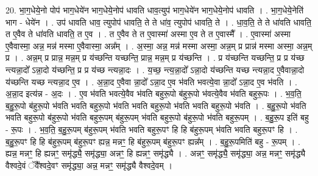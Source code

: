 \documentclass[17pt]{extarticle}
\begin{document}
20. भा॒ग॒धेये॒नो पोप॑ भाग॒धेये॑न भाग॒धेये॒नोप॑ धावति धाव॒त्युप॑ भाग॒धेये॑न भाग॒धेये॒नोप॑ धावति । . भा॒ग॒धेये॒नेति॑ भाग - धेये॑न । . उप॑ धावति धाव॒ त्युपोप॑ धावति॒ ते ते धा॑व॒ त्युपोप॑ धावति॒ ते । . धा॒व॒ति॒ ते ते धा॑वति धावति॒ त ए॒वैव ते धा॑वति धावति॒ त ए॒व । . त ए॒वैव ते त ए॒वास्मा॑ अस्मा ए॒व ते त ए॒वास्मै᳚ । . ए॒वास्मा॑ अस्मा ए॒वैवास्मा॒ अन्न॒ मन्न॑ मस्मा ए॒वैवास्मा॒ अन्न᳚म् । . अ॒स्मा॒ अन्न॒ मन्न॑ मस्मा अस्मा॒ अन्न॒म् प्र प्रान्न॑ मस्मा अस्मा॒ अन्न॒म् प्र । . अन्न॒म् प्र प्रान्न॒ मन्न॒म् प्र य॑च्छन्ति यच्छन्ति॒ प्रान्न॒ मन्न॒म् प्र य॑च्छन्ति । . प्र य॑च्छन्ति यच्छन्ति॒ प्र प्र य॑च्छ न्त्यन्ना॒दो᳚ ऽन्ना॒दो य॑च्छन्ति॒ प्र प्र य॑च्छ न्त्यन्ना॒दः । . य॒च्छ॒ न्त्य॒न्ना॒दो᳚ ऽन्ना॒दो य॑च्छन्ति यच्छ न्त्यन्ना॒द ए॒वैवान्ना॒दो य॑च्छन्ति यच्छ न्त्यन्ना॒द ए॒व । . अ॒न्ना॒द ए॒वैवा न्ना॒दो᳚ ऽन्ना॒द ए॒व भ॑वति भवत्ये॒वा न्ना॒दो᳚ ऽन्ना॒द ए॒व भ॑वति । . अ॒न्ना॒द इत्य॑न्न - अ॒दः । . ए॒व भ॑वति भवत्ये॒वैव भ॑वति बहुरू॒पो ब॑हुरू॒पो भ॑वत्ये॒वैव भ॑वति बहुरू॒पः । . भ॒व॒ति॒ ब॒हु॒रू॒पो ब॑हुरू॒पो भ॑वति भवति बहुरू॒पो भ॑वति भवति बहुरू॒पो भ॑वति भवति बहुरू॒पो भ॑वति । . ब॒हु॒रू॒पो भ॑वति भवति बहुरू॒पो ब॑हुरू॒पो भ॑वति बहुरू॒पम् ब॑हुरू॒पम् भ॑वति बहुरू॒पो ब॑हुरू॒पो भ॑वति बहुरू॒पम् । . ब॒हु॒रू॒प इति॑ बहु - रू॒पः । . भ॒व॒ति॒ ब॒हु॒रू॒पम् ब॑हुरू॒पम् भ॑वति भवति बहुरू॒पꣳ हि हि ब॑हुरू॒पम् भ॑वति भवति बहुरू॒पꣳ हि । . ब॒हु॒रू॒पꣳ हि हि ब॑हुरू॒पम् ब॑हुरू॒पꣳ ह्यन्न॒ मन्नꣳ॒॒ हि ब॑हुरू॒पम् ब॑हुरू॒पꣳ ह्यन्न᳚म् । . ब॒हु॒रू॒पमिति॑ बहु - रू॒पम् । . ह्यन्न॒ मन्नꣳ॒॒ हि ह्यन्नꣳ॒॒ समृ॑द्ध्यै॒ समृ॑द्ध्या॒ अन्नꣳ॒॒ हि ह्यन्नꣳ॒॒ समृ॑द्ध्यै । . अन्नꣳ॒॒ समृ॑द्ध्यै॒ समृ॑द्ध्या॒ अन्न॒ मन्नꣳ॒॒ समृ॑द्ध्यै वैश्वदे॒वं ॅवै᳚श्वदे॒वꣳ समृ॑द्ध्या॒ अन्न॒ मन्नꣳ॒॒ समृ॑द्ध्यै वैश्वदे॒वम् । \newline
\end{document}
